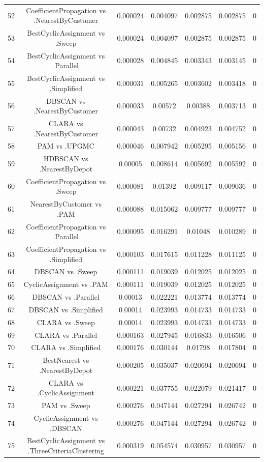\documentclass[a4paper,10pt]{article}
\begin{document}
\begin{landscape}
\begin{table}[!htp]
\begin{tabular}{ccccccc}
52&CoefficientPropagation vs .NearestByCustomer&0.000024&0.004097&0.002875&0.002875&0\\
53&BestCyclicAssignment vs .Sweep&0.000024&0.004097&0.002875&0.002875&0\\
54&BestCyclicAssignment vs .Parallel&0.000028&0.004845&0.003343&0.003145&0\\
55&BestCyclicAssignment vs .Simplified&0.000031&0.005265&0.003602&0.003418&0\\
56&DBSCAN vs .NearestByCustomer&0.000033&0.00572&0.00388&0.003713&0\\
57&CLARA vs .NearestByCustomer&0.000043&0.00732&0.004923&0.004752&0\\
58&PAM vs .UPGMC&0.000046&0.007942&0.005295&0.005156&0\\
59&HDBSCAN vs .NearestByDepot&0.00005&0.008614&0.005692&0.005592&0\\
60&CoefficientPropagation vs .Sweep&0.000081&0.01392&0.009117&0.009036&0\\
61&NearestByCustomer vs .PAM&0.000088&0.015062&0.009777&0.009777&0\\
62&CoefficientPropagation vs .Parallel&0.000095&0.016291&0.01048&0.010289&0\\
63&CoefficientPropagation vs .Simplified&0.000103&0.017615&0.011228&0.011125&0\\
64&DBSCAN vs .Sweep&0.000111&0.019039&0.012025&0.012025&0\\
65&CyclicAssignment vs .PAM&0.000111&0.019039&0.012025&0.012025&0\\
66&DBSCAN vs .Parallel&0.00013&0.022221&0.013774&0.013774&0\\
67&DBSCAN vs .Simplified&0.00014&0.023993&0.014733&0.014733&0\\
68&CLARA vs .Sweep&0.00014&0.023993&0.014733&0.014733&0\\
69&CLARA vs .Parallel&0.000163&0.027945&0.016833&0.016506&0\\
70&CLARA vs .Simplified&0.000176&0.030144&0.01798&0.017804&0\\
71&BestNearest vs .NearestByDepot&0.000205&0.035037&0.020694&0.020694&0\\
72&CLARA vs .CyclicAssignment&0.000221&0.037755&0.022079&0.021417&0\\
73&PAM vs .Sweep&0.000276&0.047144&0.027294&0.026742&0\\
74&CyclicAssignment vs .DBSCAN&0.000276&0.047144&0.027294&0.026742&0\\
75&BestCyclicAssignment vs .ThreeCriteriaClustering&0.000319&0.054574&0.030957&0.030957&0\\

\end{tabular}
\end{table}
\end{landscape}
\end{document}
